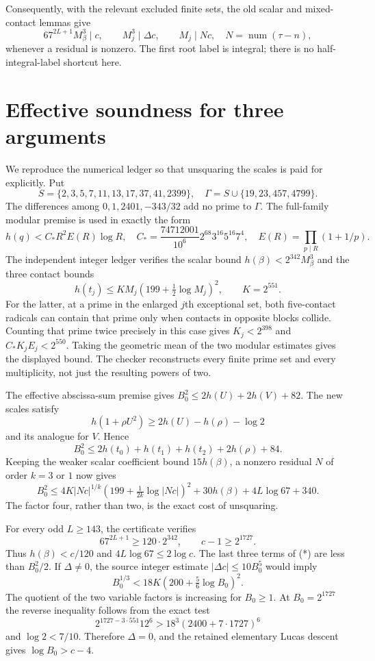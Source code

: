 \documentclass[11pt]{article}
\begin{document}
Consequently, with the relevant excluded finite sets, the old scalar
and mixed-contact lemmas give
\[
 67^{2L+1}M_\beta^3\mid c,\qquad
 M_j^3\mid\Delta c,\qquad M_j\mid Nc,
 \quad N=\operatorname{num}(\tau-n),
\]
whenever a residual is nonzero. The first root label is integral;
there is no half-integral-label shortcut here.

\section{Effective soundness for three arguments}

We reproduce the numerical ledger so that unsquaring the scales is
paid for explicitly. Put
\[
 S=\{2,3,5,7,11,13,17,37,41,2399\},\quad
 \Gamma=S\cup\{19,23,457,4799\}.
\]
The differences among $0,1,2401,-343/32$ add no prime to $\Gamma$.
The full-family modular premise is used in exactly the form
\[
 h(q)<C_*R^2E(R)\log R,\quad
 C_*=\frac{74712001}{10^6}2^{68}3^{16}5^{16}7^4,
 \quad E(R)=\prod_{p\mid R}(1+1/p).
\]
The independent integer ledger verifies the scalar bound
$h(\beta)<2^{342}M_\beta^3$ and the three contact bounds
\[
 h(t_j)\le K M_j(199+\tfrac12\log M_j)^2,
 \qquad K=2^{551}.
\]
For the latter, at a prime in the enlarged $j$th exceptional set,
both five-contact radicals can contain that prime only when contacts
in opposite blocks collide. Counting that prime twice precisely in
this case gives $K_j<2^{398}$ and $C_*K_jE_j<2^{550}$.
Taking the geometric mean of the two modular estimates gives the
displayed bound. The checker reconstructs every finite prime set and
every multiplicity, not just the resulting powers of two.

The effective abscissa-sum premise gives
$B_0^2\le2h(U)+2h(V)+82$. The new scales satisfy
\[
 h(1+\rho U^2)\ge2h(U)-h(\rho)-\log2
\]
and its analogue for $V$. Hence
\[
 B_0^2\le2h(t_0)+h(t_1)+h(t_2)+2h(\rho)+84.
\]
Keeping the weaker scalar coefficient bound $15h(\beta)$, a nonzero
residual $N$ of order $k=3$ or $1$ now gives
\[
 B_0^2\le4K|Nc|^{1/k}
       (199+\tfrac1{2k}\log|Nc|)^2
       +30h(\beta)+4L\log67+340.                 \tag{*}
\]
The factor four, rather than two, is the exact cost of unsquaring.

For every odd $L\ge143$, the certificate verifies
\[
 67^{2L+1}\ge120\cdot2^{342},\qquad
 c-1\ge2^{1727}.
\]
Thus $h(\beta)<c/120$ and $4L\log67\le2\log c$.
The last three terms of (*) are less than $B_0^2/2$.
If $\Delta\ne0$, the source integer estimate
$|\Delta c|\le10B_0^5$ would imply
\[
 B_0^{1/3}<18K(200+\tfrac56\log B_0)^2.
\]
The quotient of the two variable factors is increasing for $B_0\ge1$.
At $B_0=2^{1727}$ the reverse inequality follows from the exact test
\[
 2^{1727-3\cdot551}12^6>18^3(2400+7\cdot1727)^6
\]
and $\log2<7/10$. Therefore $\Delta=0$, and the retained elementary
Lucas descent gives $\log B_0>c-4$.
\end{document}
